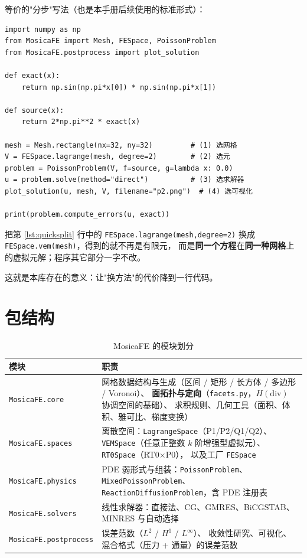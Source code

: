 \documentclass[UTF8,11pt,oneside]{ctexbook}
\theoremstyle{definition}
\theoremstyle{plain}
\newenvironment{important}{%
  \begin{tcolorbox}[colback=blue!5,colframe=blue!45,title=要点,fonttitle=\bfseries]%
}{%
  \end{tcolorbox}%
}
\newcommand{\mosica}{\textsf{MosicaFE}}
\newcommand{\code}[1]{\texttt{#1}}
\newcommand{\module}[1]{\texttt{MosicaFE.#1}}
\begin{document}
等价的"分步"写法（也是本手册后续使用的标准形式）：

\begin{lstlisting}[language=MosicaFE,caption={示例 1.2：选择网格 / 元 / 求解器 / 可视化},label={lst:quicksplit}]
import numpy as np
from MosicaFE import Mesh, FESpace, PoissonProblem
from MosicaFE.postprocess import plot_solution

def exact(x):
    return np.sin(np.pi*x[0]) * np.sin(np.pi*x[1])

def source(x):
    return 2*np.pi**2 * exact(x)

mesh = Mesh.rectangle(nx=32, ny=32)         # (1) 选网格
V = FESpace.lagrange(mesh, degree=2)        # (2) 选元
problem = PoissonProblem(V, f=source, g=lambda x: 0.0)
u = problem.solve(method="direct")          # (3) 选求解器
plot_solution(u, mesh, V, filename="p2.png")  # (4) 选可视化

print(problem.compute_errors(u, exact))
\end{lstlisting}

把第 \ref{lst:quicksplit} 行中的 \code{FESpace.lagrange(mesh,\allowbreak  degree=2)}
换成 \code{FESpace.vem(mesh)}，得到的就不再是有限元，
而是\textbf{同一个方程}在\textbf{同一种网格}上的虚拟元解；程序其它部分一字不改。

\begin{important}
这就是本库存在的意义：让"换方法"的代价降到一行代码。
\end{important}

\section{包结构}
\label{sec:package-structure}

\begin{table}[htbp]
\centering
\caption{\mosica{} 的模块划分}
\label{tab:modules}
\begin{lrbox}{\guideTableBox}
\begin{tabular}{@{}lp{10.4cm}@{}}
\toprule
模块 & 职责 \\
\midrule
\module{core} & 网格数据结构与生成（区间 / 矩形 / 长方体 / 多边形 / Voronoi）、
\textbf{面拓扑与定向}（\code{facets.py}，$H(\mathrm{div})$ 协调空间的基础）、
求积规则、几何工具（面积、体积、雅可比、梯度变换） \\
\module{spaces} & 离散空间：\code{LagrangeSpace}（P1/P2/Q1/Q2）、
\code{VEMSpace}（任意正整数 $k$ 阶增强型虚拟元）、\code{RT0Space}（RT0$\times$P0），
以及工厂 \code{FESpace} \\
\module{physics} & PDE 弱形式与组装：\code{PoissonProblem}、
\code{MixedPoissonProblem}、\code{ReactionDiffusionProblem}，含 PDE 注册表 \\
\module{solvers} & 线性求解器：直接法、CG、GMRES、BiCGSTAB、MINRES 与自动选择 \\
\module{postprocess} & 误差范数（$L^2$ / $H^1$ / $L^\infty$）、
收敛性研究、可视化、混合格式（压力 + 通量）的误差范数 \\
\bottomrule
\end{tabular}
\end{lrbox}%
\ifdim\wd\guideTableBox>\linewidth
  \resizebox{\linewidth}{!}{\usebox{\guideTableBox}}%
\else\usebox{\guideTableBox}\fi
\end{table}
\end{document}
